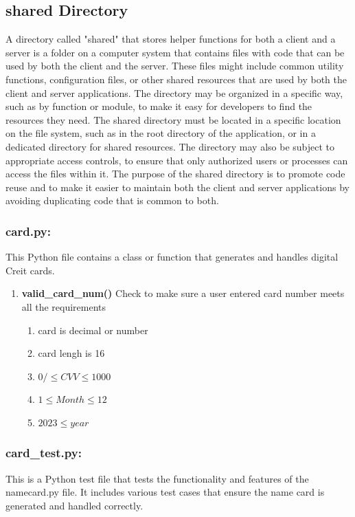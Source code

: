 \documentclass{article}
\begin{document}
\subsection{shared Directory}
    A directory called "shared" that stores helper functions for both a client and a server is a folder on a computer system that contains files with code that can be used by both the client and the server.
    These files might include common utility functions, configuration files, or other shared resources that are used by both the client and server applications.
    The directory may be organized in a specific way, such as by function or module, to make it easy for developers to find the resources they need.
The shared directory must be located in a specific location on the file system, such as in the root directory of the application, or in a dedicated directory for shared resources.
The directory may also be subject to appropriate access controls, to ensure that only authorized users or processes can access the files within it.
The purpose of the shared directory is to promote code reuse and to make it easier to maintain both the client and server applications by avoiding duplicating code that is common to both.

\subsubsection{card.py:} This Python file contains a class or function that generates and handles digital Creit cards.
\begin{enumerate}
    \item \textbf{valid\_card\_num()} Check to make sure a user entered card number meets all the requirements
    \begin{enumerate}
        \item card is decimal or number
        \item card lengh is 16
        \item $0 /\leq CVV \leq 1000$
        \item $1 \leq Month \leq 12$
        \item $2023 \leq year$
\end{enumerate}
\end{enumerate}
\subsubsection{card\_test.py:} This is a Python test file that tests the functionality and features of the namecard.py file.
It includes various test cases that ensure the name card is generated and handled correctly.
\end{document}
